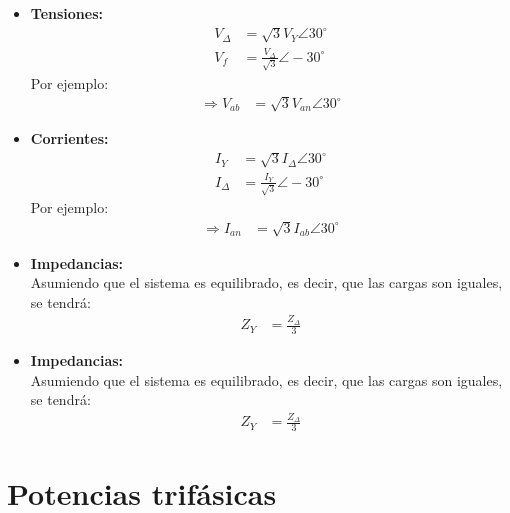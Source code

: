 \documentclass[
  11pt,
  letterpaper,
   addpoints,
   answers
  ]{exam}
\begin{document}
\begin{itemize}
    \item \textbf{Tensiones:}
    \begin{align}
        V_{\Delta} &= \sqrt{3} V_Y \angle 30^\circ \\
        V_f &= \frac{V_{\Delta}}{\sqrt{3}} \angle -30^\circ
    \end{align}
    Por ejemplo:
    \begin{align}
        \Rightarrow V_{ab} &= \sqrt{3} V_{an} \angle 30^\circ
    \end{align}
    
    \item \textbf{Corrientes:}
    \begin{align}
        I_Y &= \sqrt{3} I_{\Delta} \angle 30^\circ \\
        I_{\Delta} &= \frac{I_Y}{\sqrt{3}} \angle -30^\circ
    \end{align}
    Por ejemplo:
    \begin{align}
        \Rightarrow I_{an} &= \sqrt{3} I_{ab} \angle 30^\circ
    \end{align}
    
    \item \textbf{Impedancias:} \\
    Asumiendo que el sistema es equilibrado, es decir, que las cargas son iguales, se tendrá:
    \begin{align}
        Z_Y &= \frac{Z_{\Delta}}{3}
    \end{align}
\end{itemize}

\begin{itemize}
    \item \textbf{Impedancias:} \\
    Asumiendo que el sistema es equilibrado, es decir, que las cargas son iguales, se tendrá:
    \begin{align}
        Z_Y &= \frac{Z_{\Delta}}{3}
    \end{align}
\end{itemize}

\section*{Potencias trifásicas}
\end{document}
